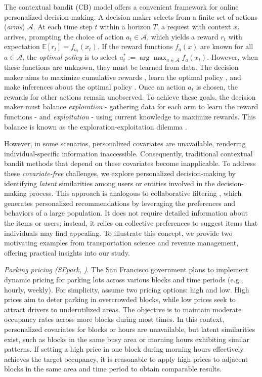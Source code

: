 \documentclass[12pt]{article}
\def\calA{{\mathcal A}}
\def\EE{{\mathbb E}}
\theoremstyle{plain}
\begin{document}
The contextual bandit (CB) model \citep{langford2007epoch} offers a convenient framework for online personalized decision-making. A decision maker selects from a finite set of actions (\emph{arms}) $\calA$. At each time step $t$ within a horizon $T$, a request with context $x_t$ arrives, prompting the choice of action $a_t \in \calA$, which yields a reward $r_t$ with expectation $\EE[r_t] = f_{a_t}(x_t)$. If the reward functions $f_a(x)$ are known for all $a \in \calA$, the \emph{optimal policy} is to select $a_t^{\ast}:= \arg\max_{a \in \calA} f_a(x_t)$. However, when these functions are unknown, they must be learned from data. 
 The decision maker aims to maximize cumulative rewards \citep{bastani2020online,li2010contextual,zhang2021statistical}, learn the optimal policy \citep{agarwal2014taming,perchet2013multi,bastani2021mostly,gur2022smoothness,may2012optimistic}, and make inferences about the optimal policy \citep{hadad2021confidence,chen2022online,chen2021statistical,zhang2021statistical}. Once an action $a_t$ is chosen, the rewards for other actions remain unobserved. To achieve these goals, the decision maker must balance \emph{exploration} -  gathering data for each arm to learn the reward functions - and \emph{exploitation} - using current knowledge to maximize rewards. This balance is known as the exploration-exploitation dilemma \citep{lattimore2020bandit}.

However, in some scenarios, personalized covariates are unavailable, rendering individual-specific information inaccessible. Consequently, traditional contextual bandit methods that depend on these covariates become inapplicable. To address these \emph{covariate-free} challenges, we explore personalized decision-making by identifying \emph{latent} similarities among users or entities involved in the decision-making process. This approach is analogous to collaborative filtering \citep{su2009survey}, which generates personalized recommendations by leveraging the preferences and behaviors of a large population. It does not require detailed information about the items or users; instead, it relies on collective preferences to suggest items that individuals may find appealing. To illustrate this concept, we provide two motivating examples from transportation science and revenue management, offering practical insights into our study.


\emph{Parking pricing (\emph{SFpark}, \cite{sfpark})}. The San Francisco government plans to implement dynamic pricing for parking lots across various blocks and time periods (e.g., hourly, weekly). For simplicity, assume two pricing options: high and low. High prices aim to deter parking in overcrowded blocks, while low prices seek to attract drivers to underutilized areas. The objective is to maintain moderate occupancy rates across more blocks during most times. In this context, personalized covariates for blocks or hours are unavailable, but latent similarities exist, such as blocks in the same busy area or morning hours exhibiting similar patterns. If setting a high price in one block during morning hours effectively achieves the target occupancy, it is reasonable to apply high prices to adjacent blocks in the same area and time period to obtain comparable results. 
\end{document}

